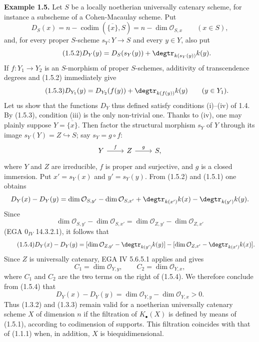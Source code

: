 \documentclass[11pt]{article}
\providecommand{\codim}{\operatorname{codim}}
\providecommand{\codim}{\operatorname{codim}}
\begin{document}
\textbf{Example 1.5.} Let $S$ be a locally noetherian universally catenary scheme, for instance a subscheme of a Cohen-Macaulay scheme. Put
\begin{equation}\tag{1.5.1}
 D_S(x)=n-\codim(\overline{\{x\}},S)=n-\dim\mathcal O_{S,x}\qquad (x\in S),
\end{equation}
and, for every proper $S$-scheme $s_Y:Y\to S$ and every $y\in Y$, also put
\begin{equation}\tag{1.5.2}
 D_Y(y)=D_S(s_Y(y))+\degtr_{k(s_Y(y))} k(y).
\end{equation}
If $f:Y_1\to Y_2$ is an $S$-morphism of proper $S$-schemes, additivity of transcendence degrees and (1.5.2) immediately give
\begin{equation}\tag{1.5.3}
 D_{Y_1}(y)=D_{Y_2}(f(y))+\degtr_{k(f(y))}k(y)\qquad (y\in Y_1).
\end{equation}
Let us show that the functions $D_Y$ thus defined satisfy conditions (i)--(iv) of 1.4. By (1.5.3), condition (iii) is the only non-trivial one. Thanks to (iv), one may plainly suppose $Y=\overline{\{x\}}$. Then factor the structural morphism $s_Y$ of $Y$ through its image $s_Y(Y)=Z\hookrightarrow S$; say $s_Y=g\circ f$:
\[
\begin{tikzcd}
Y \arrow[r,"f"] & Z \arrow[r,"g"] & S,
\end{tikzcd}
\]
where $Y$ and $Z$ are irreducible, $f$ is proper and surjective, and $g$ is a closed immersion. Put $x'=s_Y(x)$ and $y'=s_Y(y)$. From (1.5.2) and (1.5.1) one obtains
\[
D_Y(x)-D_Y(y)=\dim\mathcal O_{S,y'}-\dim\mathcal O_{S,x'}+\degtr_{k(x')}k(x)-\degtr_{k(y')}k(y).
\]
Since
\[
 \dim\mathcal O_{S,y'}-\dim\mathcal O_{S,x'}=\dim\mathcal O_{Z,y'}-\dim\mathcal O_{Z,x'}
\]
(EGA $0_{IV}$ 14.3.2.1), it follows that
\begin{equation}\tag{1.5.4}
D_Y(x)-D_Y(y)=
[\dim\mathcal O_{Z,y'}-\degtr_{k(y')}k(y)]
-[\dim\mathcal O_{Z,x'}-\degtr_{k(x')}k(x)].
\end{equation}
Since $Z$ is universally catenary, EGA IV 5.6.5.1 applies and gives
\[
 C_1=\dim\mathcal O_{Y,y},\qquad C_2=\dim\mathcal O_{Y,x},
\]
where $C_1$ and $C_2$ are the two terms on the right of (1.5.4). We therefore conclude from (1.5.4) that
\[
 D_Y(x)-D_Y(y)=\dim\mathcal O_{Y,y}-\dim\mathcal O_{Y,x}>0.
\]
Thus (1.3.2) and (1.3.3) remain valid for a noetherian universally catenary scheme $X$ of dimension $n$ if the filtration of $K_\bullet(X)$ is defined by means of (1.5.1), according to codimension of supports. This filtration coincides with that of (1.1.1) when, in addition, $X$ is biequidimensional.
\end{document}
